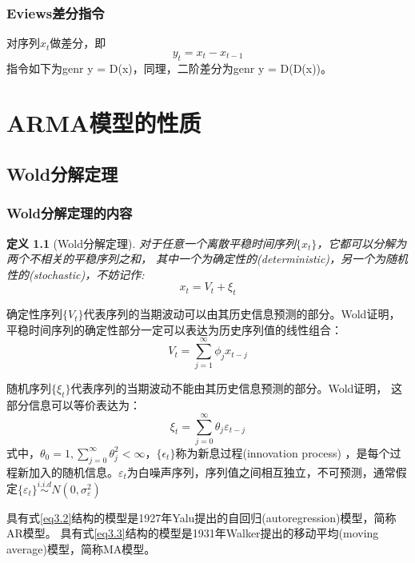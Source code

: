 \documentclass[12pt, a4paper, oneside]{ctexbook}
\newtheorem{definition}[theorem]{定义}
\begin{document}
\subsection{Eviews差分指令}
对序列$x_t$做差分，即
\begin{equation}
    y_t = x_t - x_{t-1}
\end{equation}
指令如下为genr y = D(x)，同理，二阶差分为genr y = D(D(x))。

\chapter{ARMA模型的性质}

\section{Wold分解定理}
\subsection{Wold分解定理的内容}
\begin{definition}[Wold分解定理]
    对于任意一个离散平稳时间序列$\{x_t\}$，它都可以分解为两个不相关的平稳序列之和，
    其中一个为确定性的(deterministic)，另一个为随机性的(stochastic)，不妨记作:
    \begin{equation}
        x_t = V_t+ \xi_t
    \end{equation}
\end{definition}
确定性序列$\{V_t\}$代表序列的当期波动可以由其历史信息预测的部分。Wold证明，
平稳时间序列的确定性部分一定可以表达为历史序列值的线性组合：
\begin{equation}\label{eq3.2}
    V_t = \sum_{j = 1}^{\infty}\phi_jx_{t-j}
\end{equation}

随机序列$\{\xi_t\}$代表序列的当期波动不能由其历史信息预测的部分。Wold证明，
这部分信息可以等价表达为：
\begin{equation}\label{eq3.3}
    \xi_t = \sum_{j = 0}^{\infty}\theta_j\varepsilon_{t-j}
\end{equation}
式中，$\theta_0 = 1,\sum_{j = 0}^{\infty}\theta_j^2<\infty$，$\{\epsilon_t\}$称为新息过程(innovation process)
，是每个过程新加入的随机信息。$\varepsilon_t$为白噪声序列，序列值之间相互独立，不可预测，通常假定$\{\varepsilon_t\}
    \stackrel{i.i.d}{\sim}N(0,\sigma_{\varepsilon}^{2})$

具有式\ref{eq3.2}结构的模型是1927年Yalu提出的自回归(autoregression)模型，简称AR模型。
具有式\ref{eq3.3}结构的模型是1931年Walker提出的移动平均(moving average)模型，简称MA模型。
\end{document}
